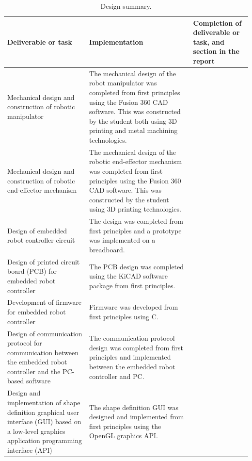 \begin{table}[H]
	\renewcommand{\arraystretch}{1.3}
	\centering
	\begin{tabular}{|>{\raggedright}m{5cm}|>{\raggedright}m{5cm}|>{\raggedright\arraybackslash}m{4cm}|}
		\hline
		\textbf{Deliverable or task} & \textbf{Implementation} & \textbf{Completion of deliverable or task, and section in the report} \\
		\hline
		Mechanical design and construction of robotic manipulator & The mechanical design of the robot manipulator was completed from first principles using the Fusion 360 CAD software. This was constructed by the student both using 3D printing and metal machining technologies. & \\
		\hline
		Mechanical design and construction of robotic end-effector mechanism & The mechanical design of the robotic end-effector mechanism was completed from first principles using the Fusion 360 CAD software. This was constructed by the student using 3D printing technologies. & \\
		\hline
		Design of embedded robot controller circuit & The design was completed from first principles and a prototype was implemented on a breadboard. & \\
		\hline
		Design of printed circuit board (PCB) for embedded robot controller & The PCB design was completed using the KiCAD software package from first principles. & \\
		\hline
		Development of firmware for embedded robot controller & Firmware was developed from first principles using C. & \\
		\hline
		Design of communication protocol for communication between the embedded robot controller and the PC-based software & The communication protocol design was completed from first principles and implemented between the embedded robot controller and PC. & \\
		\hline
		Design and implementation of shape definition graphical user interface (GUI) based on a low-level graphics application programming interface (API) & The shape definition GUI was designed and implemented from first principles using the OpenGL graphics API. & \\
		\hline
	\end{tabular}
	\caption{\label{tab:design_summary_p1}Design summary.}
\end{table}

